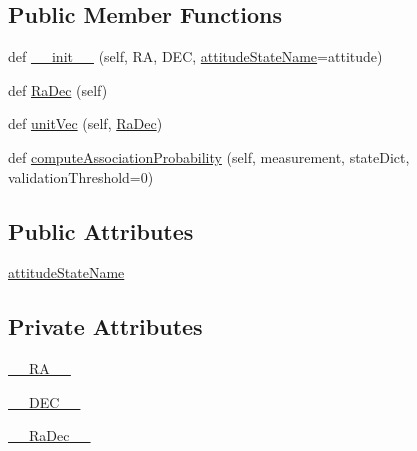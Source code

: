 \subsection*{Public Member Functions}
\begin{DoxyCompactItemize}
\item 
def \hyperlink{classmodest_1_1signals_1_1PointSource_1_1PointSource_a7e28df0f61118ee5c135aa777fd8927f}{\+\_\+\+\_\+init\+\_\+\+\_\+} (self, RA, D\+EC, \hyperlink{classmodest_1_1signals_1_1PointSource_1_1PointSource_ae9aec6bf600ed9b925e2428e7da0a8fb}{attitude\+State\+Name}=\textquotesingle{}attitude\textquotesingle{})
\item 
def \hyperlink{classmodest_1_1signals_1_1PointSource_1_1PointSource_a95e43bf6786c7b0a4a1667418fa8c419}{Ra\+Dec} (self)
\item 
def \hyperlink{classmodest_1_1signals_1_1PointSource_1_1PointSource_a46995261c063be27716014ab98df02fa}{unit\+Vec} (self, \hyperlink{classmodest_1_1signals_1_1PointSource_1_1PointSource_a95e43bf6786c7b0a4a1667418fa8c419}{Ra\+Dec})
\item 
def \hyperlink{classmodest_1_1signals_1_1PointSource_1_1PointSource_ac3603c40a497abd8ad2b1ba19d140413}{compute\+Association\+Probability} (self, measurement, state\+Dict, validation\+Threshold=0)
\end{DoxyCompactItemize}
\subsection*{Public Attributes}
\begin{DoxyCompactItemize}
\item 
\hyperlink{classmodest_1_1signals_1_1PointSource_1_1PointSource_ae9aec6bf600ed9b925e2428e7da0a8fb}{attitude\+State\+Name}
\end{DoxyCompactItemize}
\subsection*{Private Attributes}
\begin{DoxyCompactItemize}
\item 
\hyperlink{classmodest_1_1signals_1_1PointSource_1_1PointSource_aebbf89bfdecbfe1b98e6f835398e475f}{\+\_\+\+\_\+\+R\+A\+\_\+\+\_\+}
\item 
\hyperlink{classmodest_1_1signals_1_1PointSource_1_1PointSource_aa00127204cdc233b98addfdf004fc255}{\+\_\+\+\_\+\+D\+E\+C\+\_\+\+\_\+}
\item 
\hyperlink{classmodest_1_1signals_1_1PointSource_1_1PointSource_a5e8336566a9029e0e61f743ba0c76719}{\+\_\+\+\_\+\+Ra\+Dec\+\_\+\+\_\+}
\end{DoxyCompactItemize}


